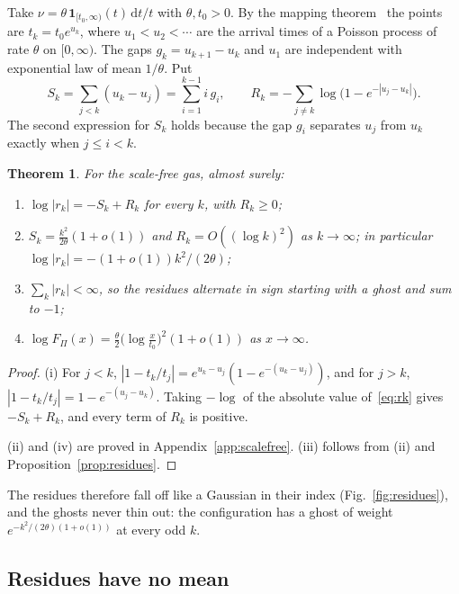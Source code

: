 \documentclass[aps,prd,twocolumn,superscriptaddress,nofootinbib,longbibliography,floatfix,amsmath,amssymb,10pt]{revtex4-2}
\newtheorem{theorem}{Theorem}
\theoremstyle{definition}
\theoremstyle{remark}
\newcommand{\dd}{\mathrm{d}}
\begin{document}
Take $\nu=\theta\,\mathbf 1_{[t_0,\infty)}(t)\,\dd t/t$ with $\theta,t_0>0$.
By the mapping theorem~\cite[Thm.~5.1]{LastPenrose2017} the points are
$t_k=t_0e^{u_k}$, where $u_1<u_2<\cdots$ are the arrival times of a Poisson
process of rate $\theta$ on $[0,\infty)$. The gaps $g_k=u_{k+1}-u_k$ and
$u_1$ are independent with exponential law of mean $1/\theta$. Put
\begin{equation}\label{eq:SR}
S_k=\sum_{j<k}(u_k-u_j)=\sum_{i=1}^{k-1}i\,g_i,\qquad
R_k=-\sum_{j\neq k}\log\bigl(1-e^{-|u_j-u_k|}\bigr).
\end{equation}
The second expression for $S_k$ holds because the gap $g_i$ separates $u_j$
from $u_k$ exactly when $j\le i<k$.

\begin{theorem}\label{thm:scalefree}
For the scale-free gas, almost surely:
\begin{enumerate}[label=(\roman*),leftmargin=*,itemsep=1pt]
\item $\log|r_k|=-S_k+R_k$ for every $k$, with $R_k\ge0$;
\item $S_k=\frac{k^2}{2\theta}(1+o(1))$ and $R_k=O((\log k)^2)$ as
$k\to\infty$; in particular $\log|r_k|=-(1+o(1))k^2/(2\theta)$;
\item $\sum_k|r_k|<\infty$, so the residues alternate in sign starting with a
ghost and sum to $-1$;
\item $\log F_\Pi(x)=\frac\theta2\bigl(\log\frac x{t_0}\bigr)^2(1+o(1))$ as
$x\to\infty$.
\end{enumerate}
\end{theorem}

\begin{proof}
(i) For $j<k$, $|1-t_k/t_j|=e^{u_k-u_j}(1-e^{-(u_k-u_j)})$, and for $j>k$,
$|1-t_k/t_j|=1-e^{-(u_j-u_k)}$. Taking $-\log$ of the absolute value
of~\eqref{eq:rk} gives $-S_k+R_k$, and every term of $R_k$ is positive.

(ii) and (iv) are proved in Appendix~\ref{app:scalefree}. (iii) follows from
(ii) and Proposition~\ref{prop:residues}.
\end{proof}

The residues therefore fall off like a Gaussian in their index
(Fig.~\ref{fig:residues}), and the ghosts never thin out: the configuration
has a ghost of weight $e^{-k^2/(2\theta)(1+o(1))}$ at every odd $k$.

\subsection{Residues have no mean}
\end{document}
